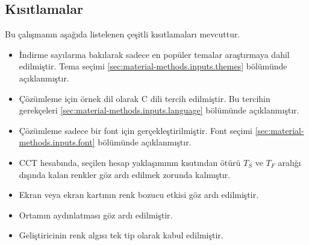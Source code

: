 \documentclass{article}
\begin{document}
\begin{comment}
Implications – The study indicates that individuals use Dark Mode for a more satisfying user experience as they feel e.g. less eye strain with a dark themed user interface. Editing and coding software is mostly designed in a light-on-dark color scheme, as users often work for long continuous hours on screen, surrounded by dark environment. As screen time per individual increases, more users are experiencing ocular diseases. In counteraction, society demanded dark themed interfaces for operating systems, websites, and apps. As individuals were already using unofficial dark themes on different interfaces, tech companies started releasing system updates to make Dark Mode a choice. As Apple released their user interface update just in 2019, Dark Mode is still a relevant trend discussed in the industry and society. Experts indicate that Dark Mode is here to stay, as it satisfies preferences of many users and makes current OLED screens and future digital devices with appropriate display technology more sustainable \cite{eisfeld2020rise}
\end{comment}

\subsection{Kısıtlamalar}

Bu çalışmanın aşağıda listelenen çeşitli kısıtlamaları mevcuttur.

\begin{itemize}
  \item İndirme sayılarına bakılarak sadece en popüler temalar araştırmaya dahil edilmiştir.  Tema seçimi
    \ref{sec:material-methods.inputs.themes} bölümünde açıklanmıştır.

  \item Çözümleme için örnek dil olarak C dili tercih edilmiştir.  Bu tercihin gerekçeleri
    \ref{sec:material-methods.inputs.language} bölümünde açıklanmıştır.

  \item Çözümleme sadece bir font için gerçekleştirilmiştir.  Font seçimi \ref{sec:material-methods.inputs.font}
    bölümünde açıklanmıştır.

  \item CCT hesabında, seçilen hesap yaklaşımının kısıtından ötürü $T_S$ ve $T_F$ aralığı dışında kalan renkler göz ardı
    edilmek zorunda kalmıştır.

	\item Ekran veya ekran kartının renk bozucu etkisi göz ardı edilmiştir.

	\item Ortamın aydınlatması göz ardı edilmiştir.

	\item Geliştiricinin renk algısı tek tip olarak kabul edilmiştir.
\end{itemize}
\end{document}
